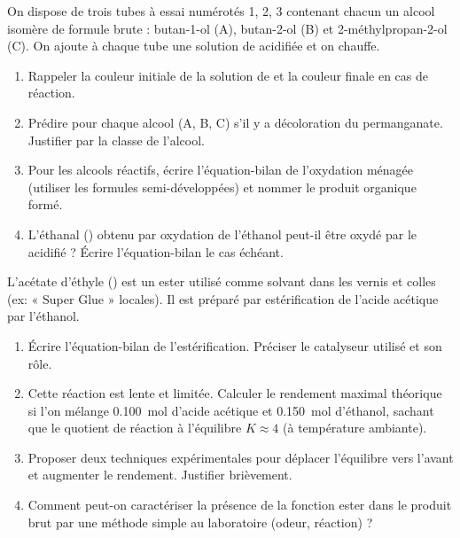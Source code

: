 \documentclass[11pt]{article}
\begin{document}
\begin{exercice}
On dispose de trois tubes à essai numérotés 1, 2, 3 contenant chacun un alcool isomère de formule brute  : butan-1-ol (A), butan-2-ol (B) et 2-méthylpropan-2-ol (C). On ajoute à chaque tube une solution de  acidifiée et on chauffe.
\begin{enumerate}
    \item Rappeler la couleur initiale de la solution de  et la couleur finale en cas de réaction.
    \item Prédire pour chaque alcool (A, B, C) s'il y a décoloration du permanganate. Justifier par la classe de l'alcool.
    \item Pour les alcools réactifs, écrire l'équation-bilan de l'oxydation ménagée (utiliser les formules semi-développées) et nommer le produit organique formé.
    \item L'éthanal () obtenu par oxydation de l'éthanol peut-il être oxydé par le  acidifié ? Écrire l'équation-bilan le cas échéant.
\end{enumerate}
\end{exercice}

\begin{exercice}
L'acétate d'éthyle () est un ester utilisé comme solvant dans les vernis et colles (ex: « Super Glue » locales). Il est préparé par estérification de l'acide acétique par l'éthanol.
\begin{enumerate}
    \item Écrire l'équation-bilan de l'estérification. Préciser le catalyseur utilisé et son rôle.
    \item Cette réaction est lente et limitée. Calculer le rendement maximal théorique si l'on mélange \SI{0,100}{mol} d'acide acétique et \SI{0,150}{mol} d'éthanol, sachant que le quotient de réaction à l'équilibre $K \approx 4$ (à température ambiante).
    \item Proposer deux techniques expérimentales pour déplacer l'équilibre vers l'avant et augmenter le rendement. Justifier brièvement.
    \item Comment peut-on caractériser la présence de la fonction ester dans le produit brut par une méthode simple au laboratoire (odeur, réaction) ?
\end{enumerate}
\end{exercice}
\end{document}
